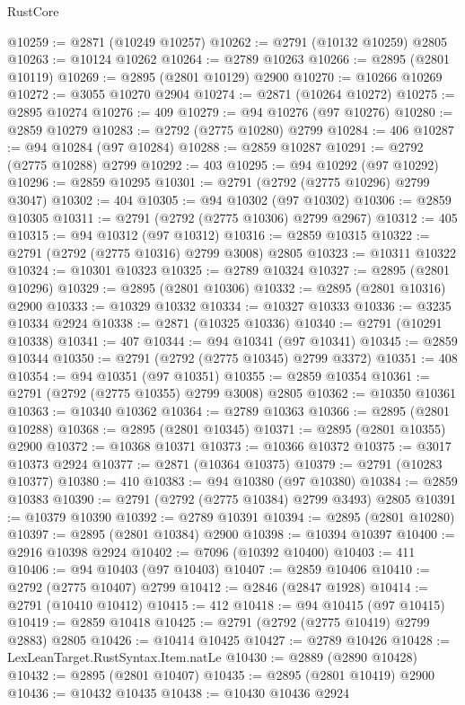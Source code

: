 \begin{lexlean}{RustCore}
\begin{coremodule}
@10259 := @2871 (@10249 @10257)
@10262 := @2791 (@10132 @10259) @2805
@10263 := @10124 @10262
@10264 := @2789 @10263
@10266 := @2895 (@2801 @10119)
@10269 := @2895 (@2801 @10129) @2900
@10270 := @10266 @10269
@10272 := @3055 @10270 @2904
@10274 := @2871 (@10264 @10272)
@10275 := @2895 @10274
@10276 := 409
@10279 := @94 @10276 (@97 @10276)
@10280 := @2859 @10279
@10283 := @2792 (@2775 @10280) @2799
@10284 := 406
@10287 := @94 @10284 (@97 @10284)
@10288 := @2859 @10287
@10291 := @2792 (@2775 @10288) @2799
@10292 := 403
@10295 := @94 @10292 (@97 @10292)
@10296 := @2859 @10295
@10301 := @2791 (@2792 (@2775 @10296) @2799 @3047)
@10302 := 404
@10305 := @94 @10302 (@97 @10302)
@10306 := @2859 @10305
@10311 := @2791 (@2792 (@2775 @10306) @2799 @2967)
@10312 := 405
@10315 := @94 @10312 (@97 @10312)
@10316 := @2859 @10315
@10322 := @2791 (@2792 (@2775 @10316) @2799 @3008) @2805
@10323 := @10311 @10322
@10324 := @10301 @10323
@10325 := @2789 @10324
@10327 := @2895 (@2801 @10296)
@10329 := @2895 (@2801 @10306)
@10332 := @2895 (@2801 @10316) @2900
@10333 := @10329 @10332
@10334 := @10327 @10333
@10336 := @3235 @10334 @2924
@10338 := @2871 (@10325 @10336)
@10340 := @2791 (@10291 @10338)
@10341 := 407
@10344 := @94 @10341 (@97 @10341)
@10345 := @2859 @10344
@10350 := @2791 (@2792 (@2775 @10345) @2799 @3372)
@10351 := 408
@10354 := @94 @10351 (@97 @10351)
@10355 := @2859 @10354
@10361 := @2791 (@2792 (@2775 @10355) @2799 @3008) @2805
@10362 := @10350 @10361
@10363 := @10340 @10362
@10364 := @2789 @10363
@10366 := @2895 (@2801 @10288)
@10368 := @2895 (@2801 @10345)
@10371 := @2895 (@2801 @10355) @2900
@10372 := @10368 @10371
@10373 := @10366 @10372
@10375 := @3017 @10373 @2924
@10377 := @2871 (@10364 @10375)
@10379 := @2791 (@10283 @10377)
@10380 := 410
@10383 := @94 @10380 (@97 @10380)
@10384 := @2859 @10383
@10390 := @2791 (@2792 (@2775 @10384) @2799 @3493) @2805
@10391 := @10379 @10390
@10392 := @2789 @10391
@10394 := @2895 (@2801 @10280)
@10397 := @2895 (@2801 @10384) @2900
@10398 := @10394 @10397
@10400 := @2916 @10398 @2924
@10402 := @7096 (@10392 @10400)
@10403 := 411
@10406 := @94 @10403 (@97 @10403)
@10407 := @2859 @10406
@10410 := @2792 (@2775 @10407) @2799
@10412 := @2846 (@2847 @1928)
@10414 := @2791 (@10410 @10412)
@10415 := 412
@10418 := @94 @10415 (@97 @10415)
@10419 := @2859 @10418
@10425 := @2791 (@2792 (@2775 @10419) @2799 @2883) @2805
@10426 := @10414 @10425
@10427 := @2789 @10426
@10428 := LexLeanTarget.RustSyntax.Item.natLe
@10430 := @2889 (@2890 @10428)
@10432 := @2895 (@2801 @10407)
@10435 := @2895 (@2801 @10419) @2900
@10436 := @10432 @10435
@10438 := @10430 @10436 @2924

\end{coremodule}
\end{lexlean}
